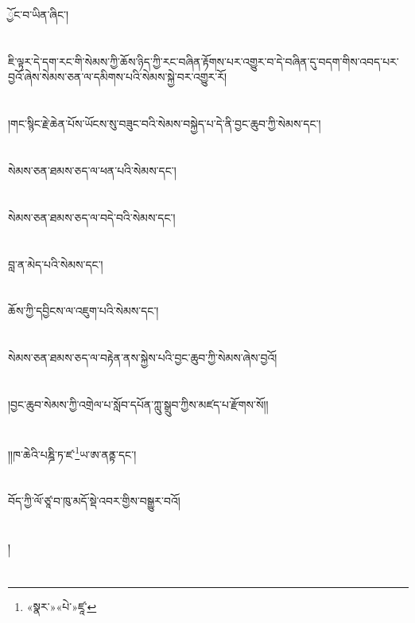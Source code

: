 ྱོང་བ་ཡིན་ཞིང་།\chapter{ }ཇི་ལྟར་དེ་དག་རང་གི་སེམས་ཀྱི་ཆོས་ཉིད་ཀྱི་རང་བཞིན་རྟོགས་པར་འགྱུར་བ་དེ་བཞིན་དུ་བདག་གིས་འབད་པར་བྱའོ་ཞེས་སེམས་ཅན་ལ་དམིགས་པའི་སེམས་སྐྱེ་བར་འགྱུར་རོ།\chapter{ }།གང་སྙིང་རྗེ་ཆེན་པོས་ཡོངས་སུ་བཟུང་བའི་སེམས་བསྐྱེད་པ་དེ་ནི་བྱང་ཆུབ་ཀྱི་སེམས་དང་།\chapter{ }སེམས་ཅན་ཐམས་ཅད་ལ་ཕན་པའི་སེམས་དང་།\chapter{ }སེམས་ཅན་ཐམས་ཅད་ལ་བདེ་བའི་སེམས་དང་།\chapter{ }བླ་ན་མེད་པའི་སེམས་དང་།\chapter{ }ཆོས་ཀྱི་དབྱིངས་ལ་འཇུག་པའི་སེམས་དང་།\chapter{ }སེམས་ཅན་ཐམས་ཅད་ལ་བརྟེན་ནས་སྐྱེས་པའི་བྱང་ཆུབ་ཀྱི་སེམས་ཞེས་བྱའོ།\chapter{ }།བྱང་ཆུབ་སེམས་ཀྱི་འགྲེལ་པ་སློབ་དཔོན་ཀླུ་སྒྲུབ་ཀྱིས་མཛད་པ་རྫོགས་སོ།།\chapter{ }།།ཁ་ཆེའི་པཎྜི་ཏ་ཛ་\footnote{«སྣར་»«པེ་»ཛཱ་}ཡ་ཨ་ནནྟ་དང་།\chapter{ }བོད་ཀྱི་ལོ་ཙཱ་བ་ཁུ་མདོ་སྡེ་འབར་གྱིས་བསྒྱུར་བའོ།\chapter{ }།\chapter{ }